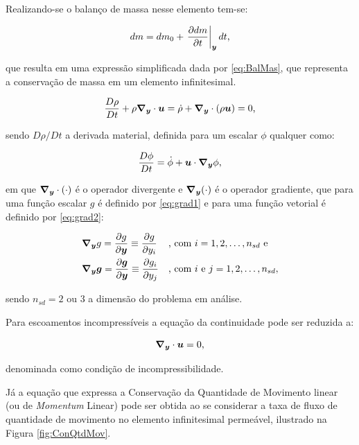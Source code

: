 Realizando-se o balanço de massa nesse elemento tem-se:

\begin{equation}
    dm=dm_0+\left.\frac{\partial{dm}}{\partial{t}}\right|_{\boldsymbol{y}}dt\text{,}
\end{equation}

\noindent que resulta em uma expressão simplificada dada por \eqref{eq:BalMas}, que representa a conservação de massa em um elemento infinitesimal.

\begin{equation}
    \frac{D\rho}{Dt}+\rho \boldsymbol{\nabla_y}\cdot\boldsymbol{u}=\dot{\rho}+\boldsymbol{\nabla_y}\cdot(\rho \boldsymbol{u})=0\text{,}
    \label{eq:BalMas}
\end{equation}

\noindent sendo $D\rho/Dt$ a derivada material, definida para um escalar $\phi$ qualquer como:

\begin{equation}
    \frac{D\phi}{Dt}=\dot{\phi}+\boldsymbol{u}\cdot\boldsymbol{\nabla_y}\phi\text{,}
\end{equation}

\noindent em que $\boldsymbol{\nabla_y}\cdot(\cdot)$ é o operador divergente e $\boldsymbol{\nabla_y}(\cdot)$ é o operador gradiente, que para uma função escalar $g$ é definido por \eqref{eq:grad1} e para uma função vetorial é definido por \eqref{eq:grad2}:

\begin{subequations}
    \begin{align}
         & \boldsymbol{\nabla_y} g=\frac{\partial{g}}{\partial{\boldsymbol{y}}}\equiv\frac{\partial{g}}{\partial{y_i}}            &  & \text{, com }i=1,2,\hdots,n_{sd}\text{ e} \label{eq:grad1}    \\
         & \boldsymbol{\nabla_y}\boldsymbol{g}=\frac{\partial{\boldsymbol{g}}}{\partial{\boldsymbol{y}}}\equiv\frac{\partial{g_i}}{\partial{y_j}} &  & \text{, com }i\text{ e }j=1,2,\hdots,n_{sd}, \label{eq:grad2}
    \end{align}
\end{subequations}

\noindent sendo $n_{sd}=2$ ou $3$ a dimensão do problema em análise.

Para escoamentos incompressíveis a equação da continuidade pode ser reduzida a:

\begin{equation}
    \boldsymbol{\nabla_y}\cdot\boldsymbol{u}=0\text{,}\label{eq:incomp}
\end{equation}

\noindent denominada como condição de incompressibilidade.

Já a equação que expressa a Conservação da Quantidade de Movimento linear (ou de \textit{Momentum} Linear) pode ser obtida ao se considerar a taxa de fluxo de quantidade de movimento no elemento infinitesimal permeável, ilustrado na Figura \ref{fig:ConQtdMov}.

